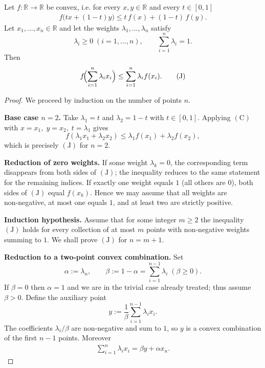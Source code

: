 \begin{theorem}
Let \(f:\mathbb{R}\to\mathbb{R}\) be convex, i.e. for every \(x,y\in\mathbb{R}\) and every \(t\in[0,1]\)
\begin{align}
f\bigl(tx+(1-t)y\bigr)\le t\,f(x)+(1-t)\,f(y).\tag{C}
\end{align}
Let \(x_{1},\dots ,x_{n}\in\mathbb{R}\) and let the weights \(\lambda_{1},\dots ,\lambda_{n}\) satisfy
\[
\lambda_{i}\ge 0\;(i=1,\dots ,n),\qquad \sum_{i=1}^{n}\lambda_{i}=1 .
\]
Then
\begin{align}
f\!\Bigl(\sum_{i=1}^{n}\lambda_{i}x_{i}\Bigr)\le \sum_{i=1}^{n}\lambda_{i}f(x_{i}).\tag{J}
\end{align}
\end{theorem}

\begin{proof}
We proceed by induction on the number of points \(n\).

\medskip\noindent\textbf{Base case \(n=2\).}  
Take \(\lambda_{1}=t\) and \(\lambda_{2}=1-t\) with \(t\in[0,1]\).  
Applying \((\mathrm{C})\) with \(x=x_{1},\;y=x_{2},\;t=\lambda_{1}\) gives
\[
f(\lambda_{1}x_{1}+\lambda_{2}x_{2})\le \lambda_{1}f(x_{1})+\lambda_{2}f(x_{2}),
\]
which is precisely \((\mathrm{J})\) for \(n=2\).

\medskip\noindent\textbf{Reduction of zero weights.}  
If some weight \(\lambda_{k}=0\), the corresponding term disappears from both sides of \((\mathrm{J})\); the inequality reduces to the same statement for the remaining indices.  
If exactly one weight equals \(1\) (all others are \(0\)), both sides of \((\mathrm{J})\) equal \(f(x_{k})\).  
Hence we may assume that all weights are non‑negative, at most one equals \(1\), and at least two are strictly positive.

\medskip\noindent\textbf{Induction hypothesis.}  
Assume that for some integer \(m\ge 2\) the inequality \((\mathrm{J})\) holds for every collection of at most \(m\) points with non‑negative weights summing to \(1\).  
We shall prove \((\mathrm{J})\) for \(n=m+1\).

\medskip\noindent\textbf{Reduction to a two‑point convex combination.}  
Set
\[
\alpha:=\lambda_{n},\qquad
\beta:=1-\alpha=\sum_{i=1}^{n-1}\lambda_{i}\;(\beta\ge 0).
\]
If \(\beta=0\) then \(\alpha=1\) and we are in the trivial case already treated; thus assume \(\beta>0\).  
Define the auxiliary point
\[
y:=\frac{1}{\beta}\sum_{i=1}^{n-1}\lambda_{i}x_{i}.
\]
The coefficients \(\lambda_{i}/\beta\) are non‑negative and sum to \(1\), so \(y\) is a convex combination of the first \(n-1\) points. Moreover
\begin{align}
\sum_{i=1}^{n}\lambda_{i}x_{i}= \beta y+\alpha x_{n}. \tag{4.1}
\end{align}


\end{proof}
